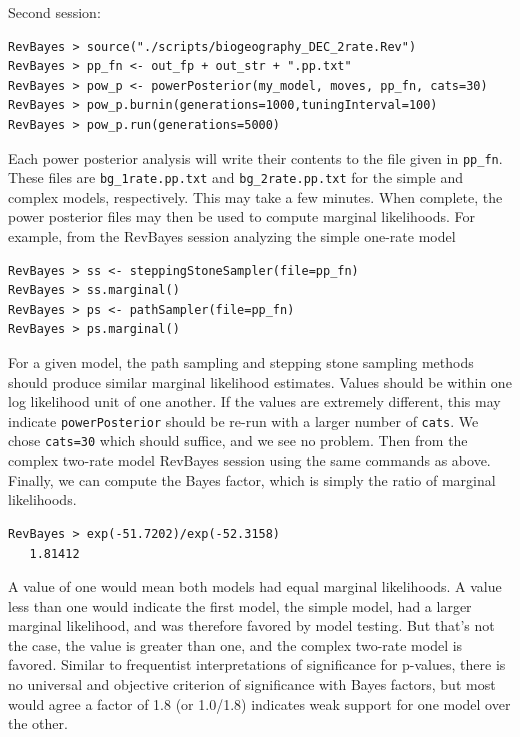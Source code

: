 \documentclass[11pt]{article}
\begin{document}
Second session:
\begin{snugshade}
\begin{lstlisting}
RevBayes > source("./scripts/biogeography_DEC_2rate.Rev")
RevBayes > pp_fn <- out_fp + out_str + ".pp.txt"
RevBayes > pow_p <- powerPosterior(my_model, moves, pp_fn, cats=30) 
RevBayes > pow_p.burnin(generations=1000,tuningInterval=100)
RevBayes > pow_p.run(generations=5000)  
\end{lstlisting}
\end{snugshade}

Each power posterior analysis will write their contents to the file given in {\tt pp\_fn}.
These files are {\tt bg\_1rate.pp.txt} and {\tt bg\_2rate.pp.txt} for the simple and complex models, respectively.
This may take a few minutes.
When complete, the power posterior files may then be used to compute marginal likelihoods.
For example, from the RevBayes session analyzing the simple one-rate model

\begin{snugshade}
\begin{lstlisting}
RevBayes > ss <- steppingStoneSampler(file=pp_fn)
RevBayes > ss.marginal() 
RevBayes > ps <- pathSampler(file=pp_fn)
RevBayes > ps.marginal() 
\end{lstlisting}
\end{snugshade}

For a given model, the path sampling and stepping stone sampling methods should produce similar marginal likelihood estimates.
Values should be within one log likelihood unit of one another.
If the values are extremely different, this may indicate {\tt powerPosterior} should be re-run with a larger number of {\tt cats}.
We chose {\tt cats=30} which should suffice, and we see no problem.
Then from the complex two-rate model RevBayes session using the same commands as above.
Finally, we can compute the Bayes factor, which is simply the ratio of marginal likelihoods.

\begin{snugshade}
\begin{lstlisting}
RevBayes > exp(-51.7202)/exp(-52.3158)
   1.81412
\end{lstlisting}
\end{snugshade}

A value of one would mean both models had equal marginal likelihoods.
A value less than one would indicate the first model, the simple model, had a larger marginal likelihood, and was therefore favored by model testing.
But that's not the case, the value is greater than one, and the complex two-rate model is favored.
Similar to frequentist interpretations of significance for p-values, there is no universal and objective criterion of significance with Bayes factors, but most would agree a factor of 1.8 (or 1.0/1.8) indicates weak support for one model over the other.
\end{document}
